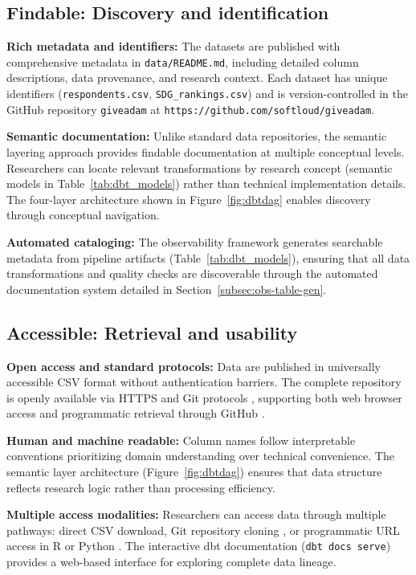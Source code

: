 \documentclass{article}
\begin{document}
\subsection{Findable: Discovery and identification}

\textbf{Rich metadata and identifiers:} The datasets are published with comprehensive metadata in \texttt{data/README.md}, including detailed column descriptions, data provenance, and research context. Each dataset has unique identifiers (\texttt{respondents.csv}, \texttt{SDG\_rankings.csv}) and is version-controlled in the GitHub repository \texttt{giveadam} at \texttt{https://github.com/softloud/giveadam}.

\textbf{Semantic documentation:} Unlike standard data repositories, the semantic layering approach provides findable documentation at multiple conceptual levels. Researchers can locate relevant transformations by research concept (semantic models in Table~\ref{tab:dbt_models}) rather than technical implementation details. The four-layer architecture shown in Figure~\ref{fig:dbtdag} enables discovery through conceptual navigation.

\textbf{Automated cataloging:} The observability framework generates searchable metadata from pipeline artifacts (Table~\ref{tab:dbt_models}), ensuring that all data transformations and quality checks are discoverable through the automated documentation system detailed in Section~\ref{subsec:obs-table-gen}.

\subsection{Accessible: Retrieval and usability}

\textbf{Open access and standard protocols:} Data are published in universally accessible CSV format \cite{csv_rfc} without authentication barriers. The complete repository is openly available via HTTPS and Git protocols \cite{git}, supporting both web browser access and programmatic retrieval through GitHub \cite{github}.

\textbf{Human and machine readable:} Column names follow interpretable conventions prioritizing domain understanding over technical convenience. The semantic layer architecture (Figure~\ref{fig:dbtdag}) ensures that data structure reflects research logic rather than processing efficiency.

\textbf{Multiple access modalities:} Researchers can access data through multiple pathways: direct CSV download, Git repository cloning \cite{git}, or programmatic URL access in R \cite{r_core} or Python \cite{python}. The interactive dbt documentation (\texttt{dbt docs serve}) \cite{dbt_core} provides a web-based interface for exploring complete data lineage.
\end{document}
